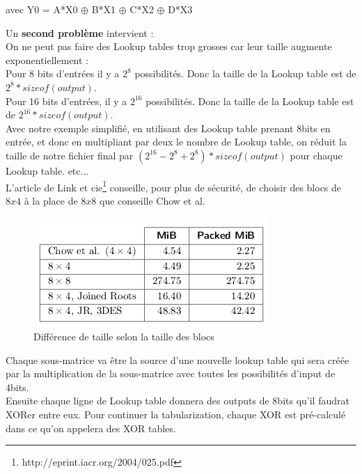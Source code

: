 \documentclass[a4paper,12pt]{article}
\begin{document}
avec Y0 = A*X0 $\oplus$ B*X1 $\oplus$ C*X2 $\oplus$ D*X3

Un \textbf{second problème} intervient :\\

On ne peut pas faire des Lookup tables trop grosses car leur taille augmente exponentiellement :\\

Pour 8 bits d'entrées il y a $2^{8}$ possibilités. Donc la taille de la Lookup table est de $2^{8} * sizeof(output)$.\\
Pour 16 bits d'entrées, il y a $2^{16}$ possibilités. Donc la taille de la Lookup table est de $2^{16} * sizeof(output)$.\\
Avec notre exemple simplifié, en utilisant des Lookup table prenant 8bits en entrée, et donc en multipliant par deux le nombre de Lookup table, on réduit la taille de notre fichier final par $(2^{16} - 2^8 + 2^8) * sizeof(output)$ pour chaque Lookup table.
etc...\\

L'article de Link et cie\footnote{http://eprint.iacr.org/2004/025.pdf} conseille, pour plus de sécurité, de choisir des blocs de $8x4$ à la place de $8x8$ que conseille Chow et al.\\



\begin{figure}[h]
\centering
\includegraphics[scale=0.80]{./images/linketal.PNG}
\caption{Différence de taille selon la taille des blocs}
\label{fig:sizedif}
\end{figure}




Chaque sous-matrice va être la source d'une nouvelle lookup table qui sera créée par la multiplication de la sous-matrice avec toutes les possibilités d'input de 4bits.\\

Ensuite chaque ligne de Lookup table donnera des outputs de 8bits qu'il faudrat XORer entre eux. Pour continuer la tabularization, chaque XOR est pré-calculé dans ce qu'on appelera des XOR tables.\\
\end{document}
